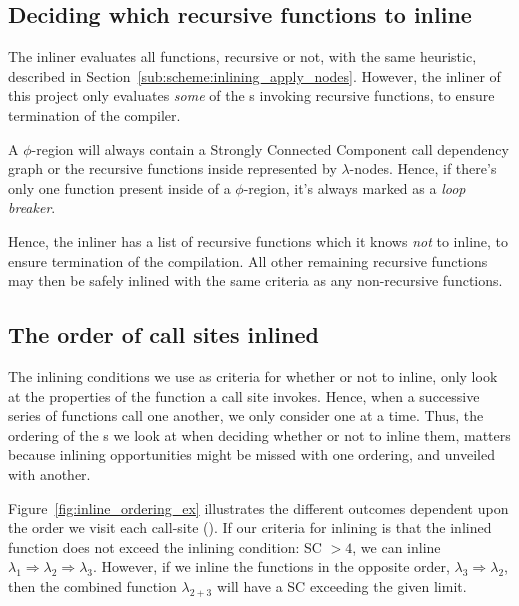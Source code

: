 \subsection{Deciding which recursive functions to inline}
\label{sub:scheme:inlining_recur_apply_nodes}

The inliner evaluates all functions, recursive or not, with the same heuristic,
described in Section~\ref{sub:scheme:inlining_apply_nodes}. However, the inliner
of this project only evaluates \textit{some} of the \applyNode s invoking
recursive functions, to ensure termination of the compiler.

A $\phi$-region will always contain a Strongly Connected Component call
dependency graph or the recursive functions inside represented by
$\lambda$-nodes. Hence, if there's only one function present inside of a
$\phi$-region, it's always marked as a \textit{loop breaker}.

Hence, the inliner has a list of recursive functions which it knows \textit{not}
to inline, to ensure termination of the compilation. All other remaining
recursive functions may then be safely inlined with the same criteria as any
non-recursive functions.

\subsection{The order of call sites inlined}
\label{sub:scheme:ordering_apply_nodes}


The inlining conditions we use as criteria for whether or not to inline, only
look at the properties of the function a call site invokes. Hence, when a
successive series of functions call one another, we only consider one at a time.
Thus, the ordering of the \applyNode s we look at when deciding whether or not
to inline them, matters because inlining opportunities might be missed with one
ordering, and unveiled with another.

Figure~\ref{fig:inline_ordering_ex} illustrates the different outcomes dependent
upon the order we visit each call-site (\applyNode ). If our criteria for
inlining is that the inlined function does not exceed the inlining condition: SC
$> 4$, we can inline $\lambda_1 \Rightarrow \lambda_2 \Rightarrow \lambda_3$.
However, if we inline the functions in the opposite order, $\lambda_3
\Rightarrow \lambda_2$, then the combined function $\lambda_{2+3}$ will have a
SC exceeding the given limit.

